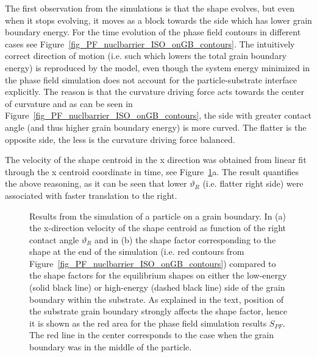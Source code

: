 The first observation from the simulations is that the shape evolves, but even when it stops evolving, it moves as a block towards the side which has lower grain boundary energy. For the time evolution of the phase field contours in different cases see Figure~\ref{fig_PF_nuclbarrier_ISO_onGB_contours}. The intuitively correct direction of motion (i.e. such which lowers the total grain boundary energy) is reproduced by the model, even though the system energy minimized in the phase field simulation does not account for the particle-substrate interface explicitly. The reason is that the curvature driving force acts towards the center of curvature and as can be seen in Figure~\ref{fig_PF_nuclbarrier_ISO_onGB_contours}, the side with greater contact angle (and thus higher grain boundary energy) is more curved. The flatter is the opposite side, the less is the curvature driving force balanced. 

The velocity of the shape centroid in the x direction was obtained from linear fit through the x centroid coordinate in time, see Figure~\ref{fig_PF_nuclbarrier_ISO_onGB_results}a. The result quantifies the above reasoning, as it can be seen that lower $\vartheta_R$ (i.e. flatter right side) were associated with faster translation to the right.

\begin{figure}
	\centering
	\caption[Results from the simulation of a particle on a grain boundary - velocity of shape motion and the shape factor]{Results from the simulation of a particle on a grain boundary. In (a) the x-direction velocity of the shape centroid as function of the right contact angle $\vartheta_R$ and in (b) the shape factor corresponding to the shape at the end of the simulation (i.e. red contours from Figure~\ref{fig_PF_nuclbarrier_ISO_onGB_contours}) compared to the shape factors for the equilibrium shapes on either the low-energy (solid black line) or high-energy (dashed black line) side of the grain boundary within the substrate. As explained in the text, position of the substrate grain boundary strongly affects the shape factor, hence it is shown as the red area for the phase field simulation results $S_{PF}$. The red line in the center corresponds to the case when the grain boundary was in the middle of the particle.}
	\label{fig_PF_nuclbarrier_ISO_onGB_results}
\end{figure}

